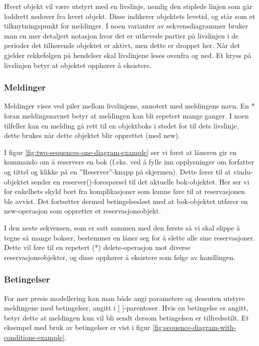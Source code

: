 Hvert objekt vil være utstyrt med en livslinje, nemlig den stiplede linjen som går loddrett nedover fra hvert objekt. Disse indikerer objektets levetid, og står som et tilknytningspunkt for meldinger. I noen varianter av sekvensdiagrammer bruker man en mer detaljert notasjon hvor det er uthevede partier på livslinjen i de perioder det tilhørende objektet er aktivt, men dette er droppet her. Når det gjelder rekkefølgen på hendelser skal livslinjene leses ovenfra og ned. Et kryss på livslinjen betyr at objektet opphører å eksistere.

\subsubsection{Meldinger}

Meldinger vises ved piler mellom livslinjene, annotert med meldingens navn. En * foran meldingsnavnet betyr at meldingen kan bli repetert mange ganger. I noen tilfeller kan en melding gå rett til en objektboks i stedet for til dets livslinje, dette brukes når dette objektet blir opprettet (med new).

I figur \ref{fig:two-sequences-one-diagram-example} ser vi først at låneren gir en kommando om å reservere en bok (f.eks. ved å fylle inn opplysninger om forfatter og tittel og klikke på en ”Reserver”-knapp på skjermen). Dette fører til at vindu-objektet sender en reserver()-forespørsel til det aktuelle bok-objektet. Her ser vi for enkelhets skyld bort fra komplikasjoner som kunne føre til at reservasjonen ble avvist. Det fortsetter dermed betingelsesløst med at bok-objektet utfører en new-operasjon som oppretter et reservasjonsobjekt.

I den neste sekvensen, som er satt sammen med den første så vi skal slippe å tegne så mange bokser, bestemmer en låner seg for å slette alle sine reservasjoner. Dette vil føre til en repetert (*) delete-operasjon mot diverse reservasjonsobjekter, og disse opphører å eksistere som følge av handlingen.

\subsubsection{Betingelser}

For mer presis modellering kan man både angi parametere og dessuten utstyre meldingene med betingelser, angitt i [ ]-parenteser. Hvis en betingelse er angitt, betyr dette at meldingen kun vil bli sendt dersom betingelsen er tilfredsstilt. Et eksempel med bruk av betingelser er vist i figur \ref{fig:sequence-diagram-with-conditions-example}.

